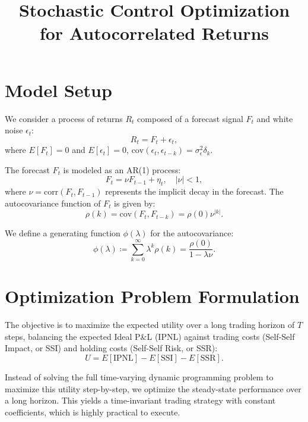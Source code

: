 \documentclass[11pt]{article}
\title{Stochastic Control Optimization for Autocorrelated Returns}
\author{}
\date{}
\begin{document}
\maketitle

\section{Model Setup}

We consider a process of returns $R_t$ composed of a forecast signal $F_t$ and white noise $\epsilon_t$:
\begin{equation}
    R_t = F_t + \epsilon_t,
\end{equation}
where $E[F_t] = 0$ and $E[\epsilon_t] = 0$, $\text{cov}(\epsilon_t, \epsilon_{t-k}) = \sigma_\epsilon^2 \delta_k$.

The forecast $F_t$ is modeled as an AR(1) process:
\begin{equation}
    F_t = \nu F_{t-1} + \eta_t, \quad |\nu| < 1,
\end{equation}
where $\nu = \text{corr}(F_t, F_{t-1})$ represents the implicit decay in the forecast. 
The autocovariance function of $F_t$ is given by:
\begin{equation}
    \rho(k) = \text{cov}(F_t, F_{t-k}) = \rho(0) \nu^{|k|}.
\end{equation}

We define a generating function $\phi(\lambda)$ for the autocovariance:
\begin{equation}
    \phi(\lambda) \coloneqq \sum_{k=0}^\infty \lambda^k \rho(k) = \frac{\rho(0)}{1 - \lambda \nu}.
\end{equation}

\section{Optimization Problem Formulation}

The objective is to maximize the expected utility over a long trading horizon of $T$ steps, balancing the expected Ideal P\&L (IPNL) against trading costs (Self-Self Impact, or SSI) and holding costs (Self-Self Risk, or SSR):
\begin{equation}
    U = E[\text{IPNL}] - E[\text{SSI}] - E[\text{SSR}].
\end{equation}

Instead of solving the full time-varying dynamic programming problem to maximize this utility step-by-step, we optimize the steady-state performance over a long horizon. This yields a time-invariant trading strategy with constant coefficients, which is highly practical to execute. 
\end{document}
